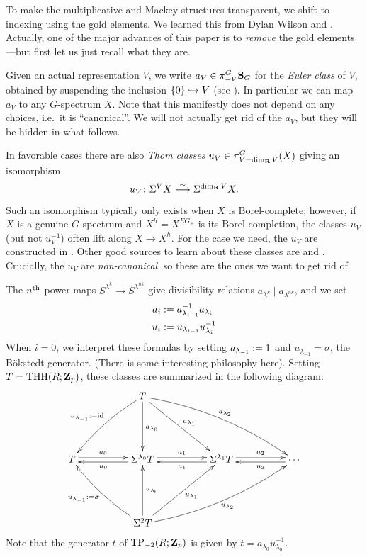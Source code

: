 \begin{notation}
  To make the multiplicative and Mackey structures transparent, we shift to indexing using the gold elements. We learned this from Dylan Wilson and \cite{Zeng}. Actually, one of the major advances of this paper is to \emph{remove} the gold elements---but first let us just recall what they are.

  Given an actual representation $V$, we write $a_V \in \pi^G_{-V} \S_G$ for the \emph{Euler class} of $V$, obtained by suspending the inclusion $\{0\}\mono V$ (see \cite[Definition 3.11]{HHR}). In particular we can map $a_V$ to any $G$-spectrum $X$. Note that this manifestly does not depend on any choices, i.e.\ it is ``canonical''. We will not actually get rid of the $a_V$, but they will be hidden in what follows.

  In favorable cases there are also \emph{Thom classes} $u_V \in \pi^G_{V-\dim_\R V}(X)$ giving an isomorphism
\[ u_V\colon \Sigma^V X \iso \Sigma^{\dim_\R V} X. \]
Such an isomorphism typically only exists when $X$ is Borel-complete; however, if $X$ is a genuine $G$-spectrum and $X^h=X^{EG_+}$ is its Borel completion, the classes $u_V$ (but not $u_V^{-1}$) often lift along $X\to X^h$. For the case we need, the $u_V$ are constructed in \cite[]{RiggenbachDoublePoints}. Other good sources to learn about these classes are \cite[]{Zeng} and \cite{HZhZ}. Crucially, the $u_V$ are \emph{non-canonical}, so these are the ones we want to get rid of.

  The $n^\th$ power maps $S^{\lambda^k} \to S^{\lambda^{nk}}$ give divisibility relations $a_{\lambda^k} \mid a_{\lambda^{nk}}$, and we set
  \begin{align*}
    a_i &\defeq a_{\lambda_{i-1}}^{-1} a_{\lambda_i}\\
    u_i &\defeq u_{\lambda_{i-1}} u_{\lambda_i}^{-1}
  \end{align*}
  When $i=0$, we interpret these formulas by setting $a_{\lambda_{-1}} \defeq 1$ and $u_{\lambda_{-1}} = \sigma$, the B\"okstedt generator. (There is some interesting philosophy here). Setting $T=\THH(R;\Z_p)$, these classes are summarized in the following diagram:
  \[\xymatrix@=5em{
    & T \ar@/_.5em/[dl]_-{a_{\lambda_{-1}} \defeq \id} \ar[d]^{a_{\lambda_0}} \ar[dr]^{a_{\lambda_1}} \ar@/^1em/[drr]^-{a_{\lambda_2}}\\
      T \ar@<.5ex>[r]^-{a_0} & \Sigma^{\lambda_0} T \ar@<.5ex>[l]^-{u_0} \ar@<.5ex>[r]^-{a_1} & \Sigma^{\lambda_1} T \ar@<.5ex>[l]^-{u_1} \ar@<.5ex>[r]^-{a_2} & \cdots \ar@<.5ex>[l]^-{u_2}\\
                            & \Sigma^2 T \ar@/^.5em/[ul]^-{u_{\lambda_{-1}} \defeq \sigma} \ar[u]_-{u_{\lambda_0}} \ar[ur]_-{u_{\lambda_1}} \ar@/_1em/[urr]_-{u_{\lambda_2}}
  }\]
  Note that the generator $t$ of $\TP_{-2}(R;\Z_p)$ is given by $t=a_{\lambda_0} u_{\lambda_0}^{-1}$.


\end{notation}
